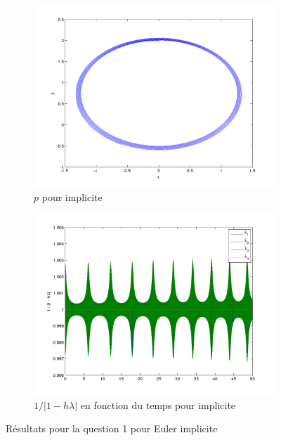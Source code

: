 \begin{figure}[!ht]
\begin{subfigure}[b]{0.45\textwidth}
    \includegraphics[width=\textwidth]{images/Q1_implicite_p.png}
    \caption{$p$ pour implicite}
    \label{fig:q1_implicite_p}
  \end{subfigure}
  \begin{subfigure}[b]{0.45\textwidth}
    \includegraphics[width=\textwidth]{images/Q1_implicite_lambda.png}
    \caption{$1/|1-h\lambda|$ en fonction du temps pour implicite}
    \label{fig:q1_implicite_lambda}
  \end{subfigure}
  \caption{Résultats pour la question 1 pour Euler implicite}
  \label{fig:q1_imp}
\end{figure}

